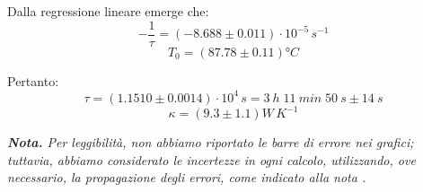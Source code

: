 \documentclass{article}
\begin{document}
Dalla regressione lineare emerge che:
\[-\frac{1}{\tau} = \left(-8.688\pm0.011\right)\cdot10^{-5}\,\unit{s^{-1}}\]
\[T_0 = \left(87.78\pm0.11\right)\unit{\degree C}\]

Pertanto:
\[\tau = \left(1.1510\pm0.0014\right)\cdot 10^4\,\unit{s} = \qty{3}{h}\;\qty{11}{min}\;\qty{50}{s}\pm\qty{14}{s}\]
\[\kappa = \left(9.3\pm1.1\right)\unit{W\,K^{-1}}\]

\emph{
    \textbf{Nota.} Per leggibilità,
    \emph{non} abbiamo riportato le barre di errore nei grafici; tuttavia, abbiamo
    considerato le incertezze in ogni calcolo, utilizzando, ove necessario, la propagazione
    degli errori, come indicato alla nota \footnotemark[2].
}
\end{document}
